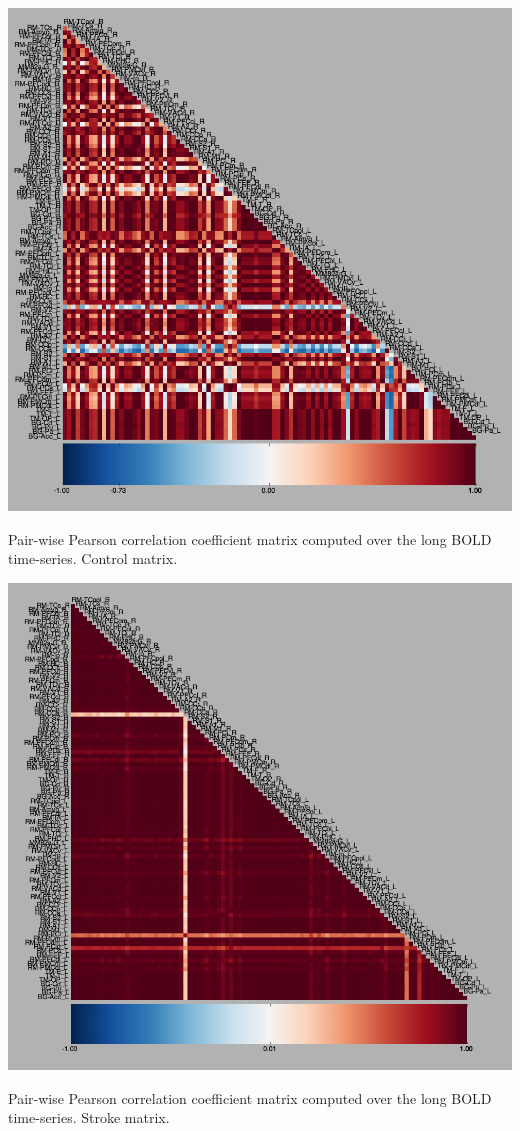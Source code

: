 \documentclass{tufte-handout}
\begin{document}
\begin{marginfigure}%
  \includegraphics[width=\linewidth]{Handout_UI_ModellingStructuralLesions_bold_pearson_g2d_control.png}
  \caption{Pair-wise Pearson correlation coefficient matrix computed over the long BOLD time-series. Control matrix. }
  \label{fig:last}
  \end{marginfigure}
  \begin{marginfigure}
  \includegraphics[width=\linewidth]{Handout_UI_ModellingStructuralLesions_bold_pearson_g2d_stroke.png}	
  \caption{Pair-wise Pearson correlation coefficient matrix computed over the long BOLD time-series. Stroke matrix.}
  \label{fig:steps_sim_07}
\end{marginfigure}
\end{document}
